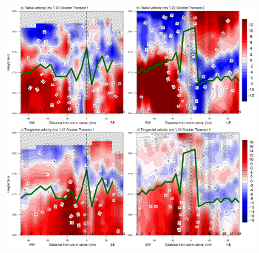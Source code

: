 \begin{figure}[ht]
\centerline{\includegraphics[width=39pc]{figures/fig10_velocities.png}}
\caption{}
\label{fig:velocities}
\end{figure}
